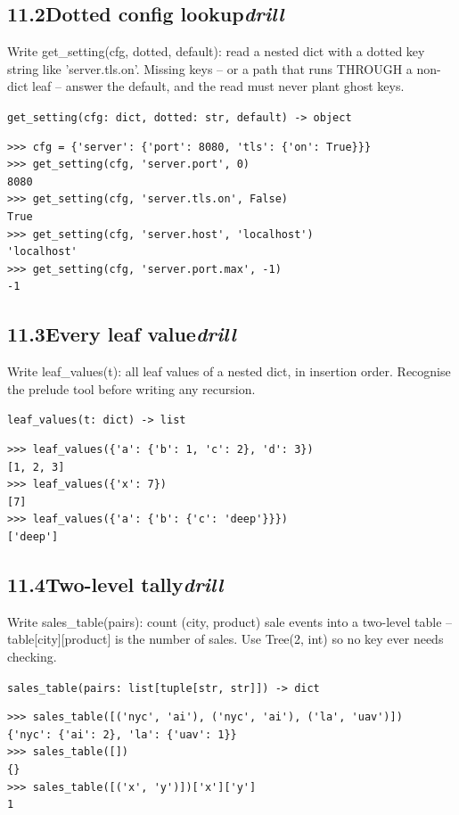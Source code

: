 \documentclass[10pt,letterpaper]{book}
\begin{document}
\subsection*{11.2\quad Dotted config lookup\hfill\textnormal{\textit{drill}}}
Write get\_setting(cfg, dotted, default): read a nested dict with a dotted key string like 'server.tls.on'. Missing keys -- or a path that runs THROUGH a non-dict leaf -- answer the default, and the read must never plant ghost keys.

\noindent\texttt{get\_setting(cfg: dict, dotted: str, default) -> object}
\begin{lstlisting}[style=ex]
>>> cfg = {'server': {'port': 8080, 'tls': {'on': True}}}
>>> get_setting(cfg, 'server.port', 0)
8080
>>> get_setting(cfg, 'server.tls.on', False)
True
>>> get_setting(cfg, 'server.host', 'localhost')
'localhost'
>>> get_setting(cfg, 'server.port.max', -1)
-1
\end{lstlisting}

\subsection*{11.3\quad Every leaf value\hfill\textnormal{\textit{drill}}}
Write leaf\_values(t): all leaf values of a nested dict, in insertion order. Recognise the prelude tool before writing any recursion.

\noindent\texttt{leaf\_values(t: dict) -> list}
\begin{lstlisting}[style=ex]
>>> leaf_values({'a': {'b': 1, 'c': 2}, 'd': 3})
[1, 2, 3]
>>> leaf_values({'x': 7})
[7]
>>> leaf_values({'a': {'b': {'c': 'deep'}}})
['deep']
\end{lstlisting}
\subsection*{11.4\quad Two-level tally\hfill\textnormal{\textit{drill}}}
Write sales\_table(pairs): count (city, product) sale events into a two-level table -- table[city][product] is the number of sales. Use Tree(2, int) so no key ever needs checking.

\noindent\texttt{sales\_table(pairs: list[tuple[str, str]]) -> dict}
\begin{lstlisting}[style=ex]
>>> sales_table([('nyc', 'ai'), ('nyc', 'ai'), ('la', 'uav')])
{'nyc': {'ai': 2}, 'la': {'uav': 1}}
>>> sales_table([])
{}
>>> sales_table([('x', 'y')])['x']['y']
1
\end{lstlisting}
\end{document}
